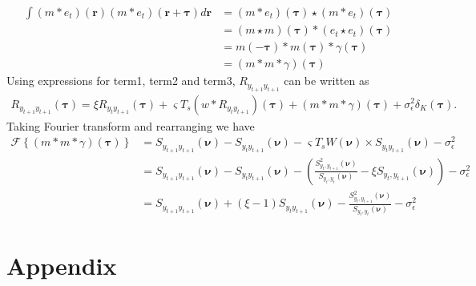 \documentclass[]{article}
\begin{document}
\begin{align}
 \int\left(m \ast e_t\right)(\mathbf r)\left(m \ast e_t\right)(\mathbf r+\boldsymbol\tau)d\mathbf r&=\left(m \ast e_t\right)(\boldsymbol\tau)\star\left(m \ast e_t\right)(\boldsymbol\tau) \nonumber \\
&=\left(m \star m\right)(\boldsymbol\tau)\ast\left(e_t \star e_t\right)(\boldsymbol\tau) \nonumber\\
&=m(-\boldsymbol\tau)\ast m(\boldsymbol\tau)\ast \gamma(\boldsymbol\tau) \nonumber \\
&=(m\ast m \ast \gamma)(\boldsymbol\tau)
\end{align}
Using expressions for term1, term2 and term3, $R_{y_{t+1}y_{t+1}}$ can be written as
\begin{align}
	R_{y_{t+1}y_{t+1}}(\boldsymbol{\tau})= \xi R_{y_ty_{t+1}}(\boldsymbol{\tau})+\varsigma T_s \left(w \ast R_{y_ty_{t+1}} \right)(\boldsymbol{\tau})+(m\ast m \ast \gamma)(\boldsymbol\tau)+\sigma_{\epsilon}^2\delta_K(\boldsymbol{\tau}).
\end{align}
Taking Fourier transform and rearranging we have
\begin{align}
 \mathcal F\left\lbrace (m\ast m \ast \gamma)(\boldsymbol\tau)\right\rbrace&= S_{y_{t+1}y_{t+1}}(\boldsymbol{\nu})-S_{y_{t}y_{t+1}}(\boldsymbol{\nu})-\varsigma T_s W(\boldsymbol{\nu}) \times S_{y_ty_{t+1}}(\boldsymbol{\nu})-\sigma_{\epsilon}^2 \nonumber \\
&=S_{y_{t+1}y_{t+1}}(\boldsymbol{\nu})-S_{y_{t}y_{t+1}}(\boldsymbol{\nu})-\left(\frac{S^2_{y_{t},y_{t+1}}\left(\boldsymbol{\nu}\right)}{S_{y_{t},y_{t}}\left(\boldsymbol{\nu}\right)} - \xi S_{y_{t},y_{t+1}}\left(\boldsymbol{\nu}\right)\right)-\sigma_{\epsilon}^2 \nonumber \\
&=S_{y_{t+1}y_{t+1}}(\boldsymbol{\nu})+(\xi-1)S_{y_{t}y_{t+1}}(\boldsymbol{\nu})-\frac{S^2_{y_{t},y_{t+1}}\left(\boldsymbol{\nu}\right)}{S_{y_{t},y_{t}}\left(\boldsymbol{\nu}\right)}-\sigma_{\epsilon}^2 
\end{align}


\section*{Appendix}
\end{document}

